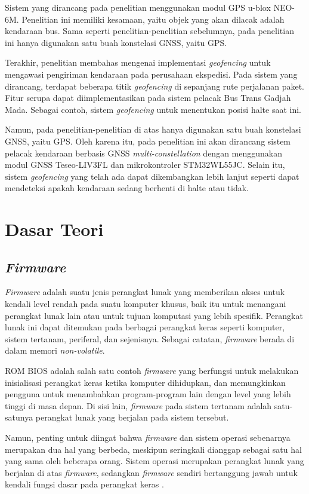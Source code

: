 Sistem yang dirancang pada penelitian \cite{Widya2016} menggunakan modul GPS u-blox NEO-6M. Penelitian ini memiliki kesamaan, yaitu objek yang akan dilacak adalah kendaraan bus. Sama seperti penelitian-penelitian sebelumnya, pada penelitian ini hanya digunakan satu buah konstelasi GNSS, yaitu GPS.

Terakhir, penelitian \cite{Priono2017} membahas mengenai implementasi \textit{geofencing} untuk mengawasi pengiriman kendaraan pada perusahaan ekspedisi. Pada sistem yang dirancang, terdapat beberapa titik \textit{geofencing} di sepanjang rute perjalanan paket. Fitur serupa dapat diimplementasikan pada sistem pelacak Bus Trans Gadjah Mada. Sebagai contoh, sistem \textit{geofencing} untuk menentukan posisi halte saat ini.

Namun, pada penelitian-penelitian di atas hanya digunakan satu buah konstelasi GNSS, yaitu GPS. Oleh karena itu, pada penelitian ini akan dirancang sistem pelacak kendaraan berbasis GNSS \textit{multi-constellation} dengan menggunakan modul GNSS Teseo-LIV3FL dan mikrokontroler STM32WL55JC. Selain itu, sistem \textit{geofencing} yang telah ada dapat dikembangkan lebih lanjut seperti dapat mendeteksi apakah kendaraan sedang berhenti di halte atau tidak.

\section{Dasar Teori}
\subsection{\textit{Firmware}}
\textit{Firmware} adalah suatu jenis perangkat lunak yang memberikan akses untuk kendali level rendah pada suatu komputer khusus, baik itu untuk menangani perangkat lunak lain atau untuk tujuan komputasi yang lebih spesifik. Perangkat lunak ini dapat ditemukan pada berbagai perangkat keras seperti komputer, sistem tertanam, periferal, dan sejenisnya. Sebagai catatan, \textit{firmware} berada di dalam memori \textit{non-volatile}.

ROM BIOS adalah salah satu contoh \textit{firmware} yang berfungsi untuk melakukan inisialisasi perangkat keras ketika komputer dihidupkan, dan memungkinkan pengguna untuk menambahkan program-program lain dengan level yang lebih tinggi di masa depan. Di sisi lain, \textit{firmware} pada sistem tertanam adalah satu-satunya perangkat lunak yang berjalan pada sistem tersebut.

Namun, penting untuk diingat bahwa \textit{firmware} dan sistem operasi sebenarnya merupakan dua hal yang berbeda, meskipun seringkali dianggap sebagai satu hal yang sama oleh beberapa orang. Sistem operasi merupakan perangkat lunak yang berjalan di atas \textit{firmware}, sedangkan \textit{firmware} sendiri bertanggung jawab untuk kendali fungsi dasar pada perangkat keras \cite{Davidson1978}.

